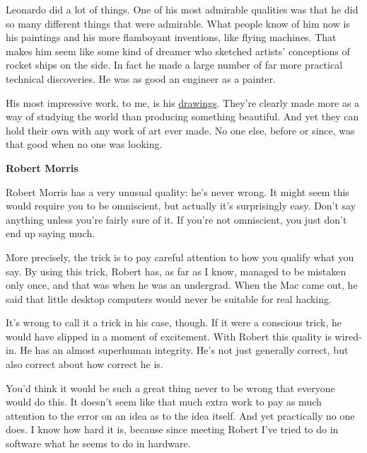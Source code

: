 Leonardo did a lot of things. One of his
                  most admirable qualities was that he did so many different
                  things that were admirable. What people know of him now is his
                  paintings and his more flamboyant inventions, like flying
                  machines. That makes him seem like some kind of dreamer who
                  sketched artists' conceptions of rocket ships on the side. In
                  fact he made a large number of far more practical technical
                  discoveries. He was as good an engineer as a painter.

His
                  most impressive work, to me, is his
                  \href{https://sep.turbifycdn.com/ty/cdn/paulgraham/leonardo-skull.jpg?t=1688221954\&}{drawings}. They're clearly made more as a way of studying the world
                  than producing something beautiful. And yet they can hold
                  their own with any work of art ever made. No one else, before
                  or since, was that good when no one was looking.


                  \textbf{Robert Morris}

Robert Morris has a very
                  unusual quality: he's never wrong. It might seem this would
                  require you to be omniscient, but actually it's surprisingly
                  easy. Don't say anything unless you're fairly sure of it. If
                  you're not omniscient, you just don't end up saying much.

More
                  precisely, the trick is to pay careful attention to how you
                  qualify what you say. By using this trick, Robert has, as far
                  as I know, managed to be mistaken only once, and that was when
                  he was an undergrad. When the Mac came out, he said that
                  little desktop computers would never be suitable for real
                  hacking.

It's wrong to call it a trick in his case,
                  though. If it were a conscious trick, he would have slipped in
                  a moment of excitement. With Robert this quality is wired-in.
                  He has an almost superhuman integrity. He's not just generally
                  correct, but also correct about how correct he is.

You'd
                  think it would be such a great thing never to be wrong that
                  everyone would do this. It doesn't seem like that much extra
                  work to pay as much attention to the error on an idea as to
                  the idea itself. And yet practically no one does. I know how
                  hard it is, because since meeting Robert I've tried to do in
                  software what he seems to do in hardware.


